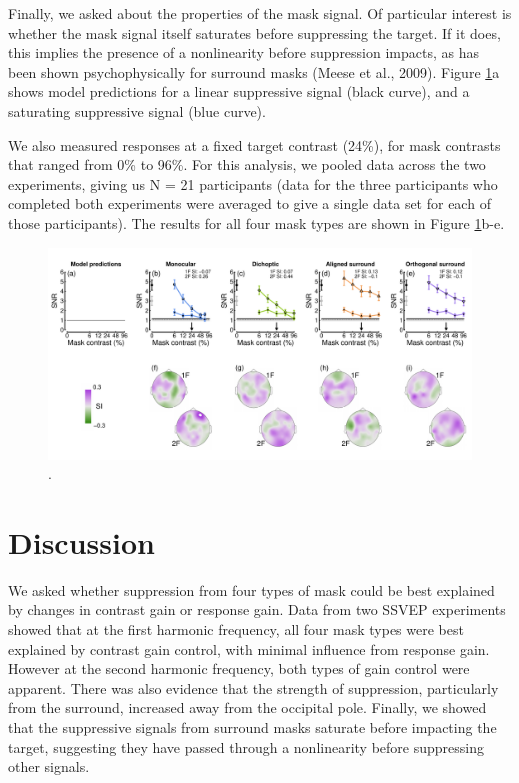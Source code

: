 \documentclass[]{article}
\begin{document}
Finally, we asked about the properties of the mask signal. Of particular interest is whether the mask signal itself saturates before suppressing the target. If it does, this implies the presence of a nonlinearity before suppression impacts, as has been shown psychophysically for surround masks (Meese et al., 2009). Figure \ref{fig:masksignals}a shows model predictions for a linear suppressive signal (black curve), and a saturating suppressive signal (blue curve).

We also measured responses at a fixed target contrast (24\%), for mask contrasts that ranged from 0\% to 96\%. For this analysis, we pooled data across the two experiments, giving us N = 21 participants (data for the three participants who completed both experiments were averaged to give a single data set for each of those participants). The results for all four mask types are shown in Figure \ref{fig:masksignals}b-e.

\begin{figure}

{\centering \includegraphics{figures/masksignals} 

}

\caption{.}\label{fig:masksignals}
\end{figure}

\hypertarget{discussion}{%
\section{Discussion}\label{discussion}}

We asked whether suppression from four types of mask could be best explained by changes in contrast gain or response gain. Data from two SSVEP experiments showed that at the first harmonic frequency, all four mask types were best explained by contrast gain control, with minimal influence from response gain. However at the second harmonic frequency, both types of gain control were apparent. There was also evidence that the strength of suppression, particularly from the surround, increased away from the occipital pole. Finally, we showed that the suppressive signals from surround masks saturate before impacting the target, suggesting they have passed through a nonlinearity before suppressing other signals.
\end{document}
